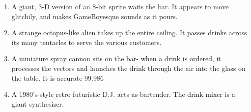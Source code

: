 \documentclass{article}
\begin{document}
\begin{enumerate}
	\item A giant, 3-D version of an 8-bit sprite waits the bar. It appears to move glitchily, and makes GameBoyesque sounds as it pours.
	\item A strange octopus-like alien takes up the entire ceiling. It passes drinks across its many tentacles to serve the various customers.
	\item A miniature spray cannon sits on the bar- when a drink is ordered, it processes the vectors and launches the drink through the air into the glass on the table. It is accurate 99.986%
	\item A 1980's-style retro futuristic D.J. acts as bartender. The drink mixer is a giant synthesizer.

\end{enumerate}
\end{document}
